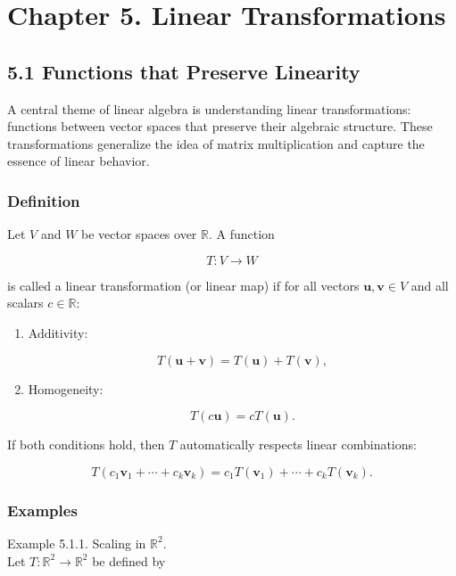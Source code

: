 \documentclass[
  12pt,
  a4paper,
]{article}
\let\oldsection\section
\renewcommand{\section}{\clearpage\oldsection}
\begin{document}
\section{Chapter 5. Linear
Transformations}\label{chapter-5-linear-transformations}

\subsection{5.1 Functions that Preserve
Linearity}\label{51-functions-that-preserve-linearity}

A central theme of linear algebra is understanding linear
transformations: functions between vector spaces that preserve their
algebraic structure. These transformations generalize the idea of matrix
multiplication and capture the essence of linear behavior.

\subsubsection{Definition}\label{definition-3}

Let \(V\) and \(W\) be vector spaces over \(\mathbb{R}\). A function

\[T : V \to W\]

is called a linear transformation (or linear map) if for all vectors
\(\mathbf{u}, \mathbf{v} \in V\) and all scalars \(c \in \mathbb{R}\):

\begin{enumerate}
\def\labelenumi{\arabic{enumi}.}
\item
  Additivity:

  \[T(\mathbf{u} + \mathbf{v}) = T(\mathbf{u}) + T(\mathbf{v}),\]
\item
  Homogeneity:

  \[T(c\mathbf{u}) = cT(\mathbf{u}).\]
\end{enumerate}

If both conditions hold, then \(T\) automatically respects linear
combinations:

\[T(c_1\mathbf{v}_1 + \cdots + c_k\mathbf{v}_k) = c_1 T(\mathbf{v}_1) + \cdots + c_k T(\mathbf{v}_k).\]

\subsubsection{Examples}\label{examples-4}

Example 5.1.1. Scaling in \(\mathbb{R}^2\).\\
Let \(T:\mathbb{R}^2 \to \mathbb{R}^2\) be defined by
\end{document}
